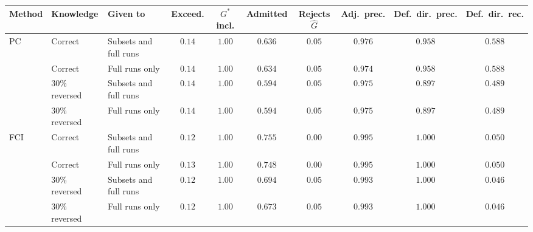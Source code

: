 \begin{tabular}{lllccccccc}
\toprule
Method & Knowledge & Given to & Exceed. & $G^\ast$ incl. & Admitted & Rejects $\widehat G$ & Adj.\ prec. & Def.\ dir.\ prec. & Def.\ dir.\ rec. \\
\midrule
PC & Correct & Subsets and full runs & $0.14$ & $1.00$ & $0.636$ & $0.05$ & $0.976$ & $0.958$ & $0.588$ \\
 & Correct & Full runs only & $0.14$ & $1.00$ & $0.634$ & $0.05$ & $0.974$ & $0.958$ & $0.588$ \\
 & 30\% reversed & Subsets and full runs & $0.14$ & $1.00$ & $0.594$ & $0.05$ & $0.975$ & $0.897$ & $0.489$ \\
 & 30\% reversed & Full runs only & $0.14$ & $1.00$ & $0.594$ & $0.05$ & $0.975$ & $0.897$ & $0.489$ \\
\midrule
FCI & Correct & Subsets and full runs & $0.12$ & $1.00$ & $0.755$ & $0.00$ & $0.995$ & $1.000$ & $0.050$ \\
 & Correct & Full runs only & $0.13$ & $1.00$ & $0.748$ & $0.00$ & $0.995$ & $1.000$ & $0.050$ \\
 & 30\% reversed & Subsets and full runs & $0.12$ & $1.00$ & $0.694$ & $0.05$ & $0.993$ & $1.000$ & $0.046$ \\
 & 30\% reversed & Full runs only & $0.12$ & $1.00$ & $0.673$ & $0.05$ & $0.993$ & $1.000$ & $0.046$ \\
\bottomrule
\end{tabular}
